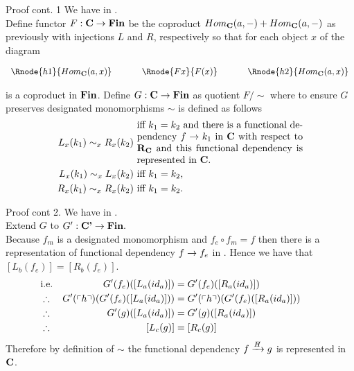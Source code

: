 \begin{frame}{Proof cont. 1}
We have \fgsourcediagram in \catc. \\
\medskip
Define functor $F: \catc \morph \Fin$ be the coproduct $Hom_{\catc}(a,-) + Hom_{\catc}(a,-)$
as previously with injections $L$ and $R$, respectively so that
for each object $x$ of \catcw the diagram
\begin{center}
$
\begin{array}{c p{0.5cm} c p{0.5cm} c  }
\Rnode{h1}{Hom_{\catc}(a,x)}  &&\Rnode{Fx}{F(x)}  &&   \Rnode{h2}{Hom_{\catc}(a,x)}       
\end{array} 
$
\end{center}
is a coproduct in $\Fin$.
\medskip
Define $G: \catc \morph \Fin$ as quotient $F/\sim$ where 
to ensure $G$ preserves designated monomorphisms  $\sim$ is defined as follows
\begin{align*}
L_x(k_1) \sim_x R_x(k_2) & \mbox{ \parbox{6cm}{iff  $k_1=k_2$ and there is a functional dependency 
$f \morph k_1$ in \catcw with respect to $\reqtc$ and  this functional dependency is represented in \catc.}}\\
L_x(k_1) \sim_x L_x(k_2) & \mbox{ iff $k_1 = k_2$,} \\
R_x(k_1) \sim_x R_x(k_2) & \mbox{ iff $k_1 = k_2$.} \\
\end{align*} 
\end{frame}

\begin{frame}{Proof cont 2.}
We have   in \catcp.\\
\medskip
Extend $G$ to $G':\catcp \morph \Fin.$ \\
Because $f_m$ is a designated monomorphism and $f_e \circ f_m = f$ then
there is a representation of functional dependency $f \morph f_e$ in \catc.
Hence  we have that $[L_b(f_e)]= [R_b(f_e)]$.
\medskip
\begin{align*}
&\mbox{i.e.}& G'(f_e)([L_a(id_a)])              &= G'(f_e)([R_a(id_a)])       \\
&\therefore & G'(\qq{h}) (G'(f_e)([L_a(id_a)])) &= G'(\qq{h}) (G'(f_e)([R_a(id_a)])) \\
&\therefore & G'(g)([L_a(id_a)])              &= G'(g)([R_a(id_a)]) & &    \\
&\therefore & [L_c(g)] &= [R_c(g)] 
\end{align*}
Therefore by definition of $\sim$ the functional dependency
$\fundep{H}{f}{g}$ is represented in $\catc$.
\end{frame}
\fi

